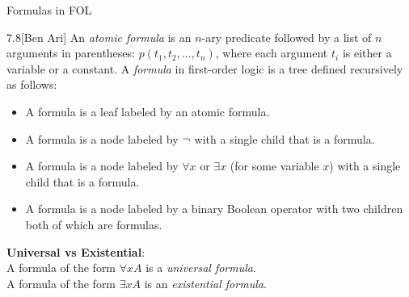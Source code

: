 \documentclass[style=sailor,size=12pt]{powerdot}
\begin{document}
\begin{wideslide}[bm=,toc=]{Formulas in FOL}
\begin{defn}{7.8}[Ben Ari]
An \emph{atomic formula} is an $n$-ary predicate followed by a list of $n$
arguments in parentheses: $p(t_1,t_2,...,t_n)$, where each argument $t_i$ is
either a variable or a constant. A \emph{formula} in first-order logic is
a tree defined recursively as follows:
\end{defn}
\vspace{-3ex}
\begin{itemize}
\item A formula is a leaf labeled by an atomic formula.
\item A formula is a node labeled by $\mathop{\neg}$ with a single child that is a
formula.
\item A formula is a node labeled by $\forall x$ or $\exists x$ (for some
 variable $x$) with a single child that is a formula.
\item A formula is a node labeled by a binary Boolean operator with two
children both of which are formulas.
\end{itemize}
{\bf Universal vs Existential}:\\
A formula of the form $\forall x A$ is a \emph{universal formula}.\\
A formula of the form $\exists x A$ is an \emph{existential formula}.\\
\end{wideslide}
\end{document}
